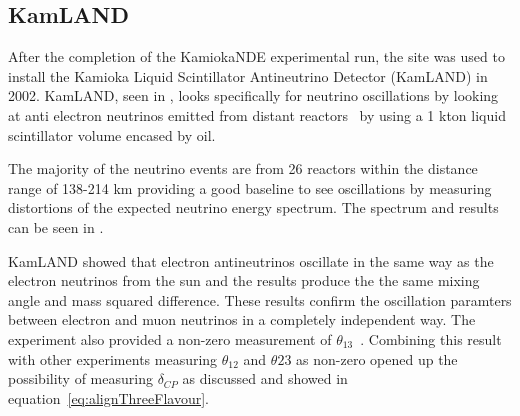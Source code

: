 \subsection{KamLAND}
After the completion of the KamiokaNDE experimental run, the site was used to install the Kamioka Liquid Scintillator Antineutrino Detector (KamLAND) in 2002. KamLAND, seen in , looks specifically for neutrino oscillations by looking at anti electron neutrinos emitted from distant reactors~\cite{46KamLAND} by using a 1 kton liquid scintillator volume encased by oil. %

The majority of the neutrino events are from 26 reactors within the distance range of 138-214 km providing a good baseline to see oscillations by measuring distortions of the expected neutrino energy spectrum. The spectrum and results can be seen in . 

KamLAND showed that electron antineutrinos oscillate in the same way as the electron neutrinos from the sun and the results produce the the same mixing angle and mass squared difference. These results confirm the oscillation paramters between electron and muon neutrinos in a completely independent way. The experiment also provided a non-zero measurement of $\theta_{13}$~\cite{107Gando}. Combining this result with other experiments measuring  $\theta_{12}$ and $\theta{23}$ as non-zero opened up the possibility of measuring $\delta_{CP}$ as discussed and showed in equation~\ref{eq:alignThreeFlavour}.

